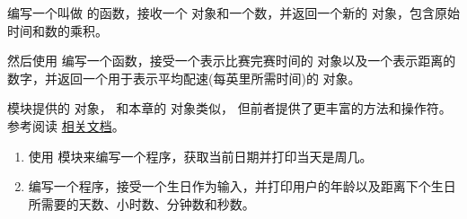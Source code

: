 {\begin{exercise}
编写一个叫做 {\em {}} 的函数，接收一个 {\em {}} 对象和一个数，并返回一个新的 {\em {}} 对象，包含原始时间和数的乘积。

然后使用 {\em {}} 编写一个函数，接受一个表示比赛完赛时间的 {\em {}} 对象以及一个表示距离的数字，并返回一个用于表示平均配速(每英里所需时间)的 {\em {}} 对象。


\end{exercise}


\begin{exercise}
  



{\em {}} 模块提供的 {\em {}} 对象，
和本章的 {\em {}} 对象类似， 但前者提供了更丰富的方法和操作符。
参考阅读 \href{http://docs.python.org/3/library/datetime.html}{相关文档}。

\begin{enumerate}

\item 使用 {\em {}} 模块来编写一个程序，获取当前日期并打印当天是周几。

\item 编写一个程序，接受一个生日作为输入，并打印用户的年龄以及距离下个生日所需要的天数、小时数、分钟数和秒数。


\end{enumerate}
\end{exercise}}
